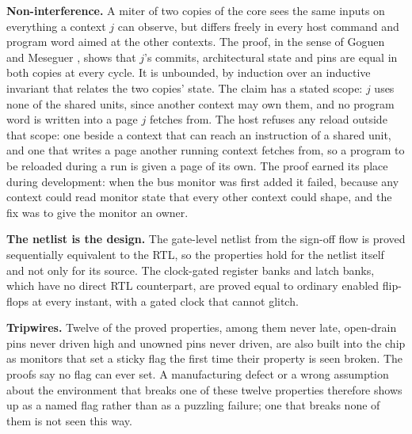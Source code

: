\documentclass[conference,letterpaper]{IEEEtran}
\begin{document}
\textbf{Non-interference.} A miter of two copies of the core sees the same inputs on
everything a context $j$ can observe, but differs freely in every host command and
program word aimed at the other contexts. The proof, in the sense of Goguen and Meseguer
\cite{noninterference}, shows that $j$'s commits, architectural state and pins are equal
in both copies at every cycle. It is unbounded, by induction over an inductive invariant
that relates the two copies' state. The claim has a stated scope: $j$ uses none of the shared units,
since another context may own them, and no program word is written into a page $j$
fetches from. The host refuses any reload outside that scope: one beside a context that
can reach an instruction of a shared unit, and one that writes a page another running
context fetches from, so a program to be reloaded during a run is given a page of its
own. The proof earned its place during development: when the bus monitor was first
added it failed, because any context could read monitor state that every other context
could shape, and the fix was to give the monitor an owner.

\textbf{The netlist is the design.} The gate-level netlist from the sign-off flow is
proved sequentially equivalent to the RTL, so the properties hold for the netlist itself
and not only for its source. The clock-gated register banks and latch banks, which have
no direct RTL counterpart, are proved equal to ordinary enabled flip-flops at every
instant, with a gated clock that cannot glitch.

\textbf{Tripwires.} Twelve of the proved properties, among them never late, open-drain
pins never driven high and unowned pins never driven, are also built into the chip
as monitors that set a sticky flag the first time their property is seen broken. The
proofs say no flag can ever set. A manufacturing defect or a wrong assumption about the
environment that breaks one of these twelve properties therefore shows up as a named flag
rather than as a puzzling failure; one that breaks none of them is not seen this way.
\end{document}
